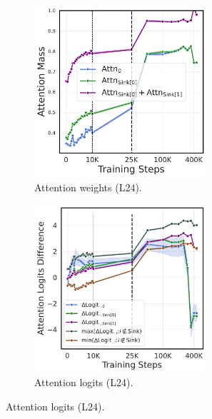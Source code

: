 \begin{figure}
    \centering
    \begin{subfigure}{0.45\textwidth}
    \centering 
    \caption{Attention weights (L24).}
    \includegraphics[width=0.7\textwidth]{Figures/olmo_batch/attn_mass_on_top_two_tokens.pdf}
    \end{subfigure}
    \begin{subfigure}{0.45\textwidth}
    \centering 
    \caption{Attention logits (L24).}
    \includegraphics[width=0.7\textwidth]{Figures/olmo_batch/attention_logits.pdf}
    \end{subfigure}
    

\end{figure}
